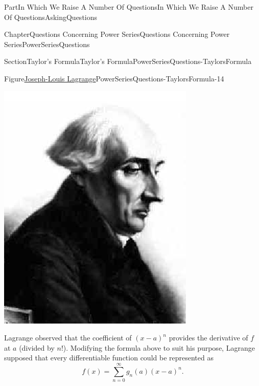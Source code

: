 \documentclass[oneside,10pt,]{book}
\numberwithin{equation}{part}
\begin{document}
\begin{partptx}{Part}{In Which We Raise A Number Of Questions}{}{In Which We Raise A Number Of Questions}{}{}{AskingQuestions}
\begin{chapterptx}{Chapter}{Questions Concerning Power Series}{}{Questions Concerning Power Series}{}{}{PowerSeriesQuestions}
\begin{sectionptx}{Section}{Taylor's Formula}{}{Taylor's Formula}{}{}{PowerSeriesQuestions-TaylorsFormula}
\begin{figureptx}{Figure}{\href{https://mathshistory.st-andrews.ac.uk/Biographies/Lagrange/}{Joseph-Louis Lagrange}\protect\footnotemark{}}{PowerSeriesQuestions-TaylorsFormula-14}{}%
%
\begin{image}{0.325}{0.35}{0.325}{}%
\includegraphics[width=\linewidth]{external/images/Lagrange.png}
\end{image}%
\tcblower
\end{figureptx}%
%
Lagrange observed that the coefficient of \((x-a)^n\) provides the derivative of \(f\) at \(a\) (divided by \(n!\)). Modifying the formula above to suit his purpose, Lagrange supposed that every differentiable function could be represented as%
\begin{equation*}
f(x) = \sum_{n=0}^\infty g_n(a)(x-a)^n\text{.}
\end{equation*}
%
\par

\end{sectionptx}
\end{chapterptx}
\end{partptx}
\end{document}
